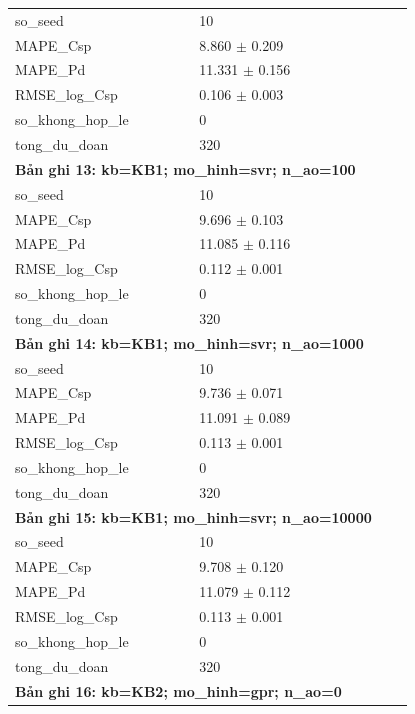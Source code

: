 \begin{longtable}{p{0.43\linewidth}p{0.50\linewidth}}
so\_\allowbreak seed & 10 \\
MAPE\_\allowbreak Csp & 8.860 $\pm$ 0.209 \\
MAPE\_\allowbreak Pd & 11.331 $\pm$ 0.156 \\
RMSE\_\allowbreak log\_\allowbreak Csp & 0.106 $\pm$ 0.003 \\
so\_\allowbreak khong\_\allowbreak hop\_\allowbreak le & 0 \\
tong\_\allowbreak du\_\allowbreak doan & 320 \\
\midrule
\multicolumn{2}{p{0.95\linewidth}}{\textbf{Bản ghi 13: kb=KB1; mo\_hinh=svr; n\_ao=100}} \\
so\_\allowbreak seed & 10 \\
MAPE\_\allowbreak Csp & 9.696 $\pm$ 0.103 \\
MAPE\_\allowbreak Pd & 11.085 $\pm$ 0.116 \\
RMSE\_\allowbreak log\_\allowbreak Csp & 0.112 $\pm$ 0.001 \\
so\_\allowbreak khong\_\allowbreak hop\_\allowbreak le & 0 \\
tong\_\allowbreak du\_\allowbreak doan & 320 \\
\midrule
\multicolumn{2}{p{0.95\linewidth}}{\textbf{Bản ghi 14: kb=KB1; mo\_hinh=svr; n\_ao=1000}} \\
so\_\allowbreak seed & 10 \\
MAPE\_\allowbreak Csp & 9.736 $\pm$ 0.071 \\
MAPE\_\allowbreak Pd & 11.091 $\pm$ 0.089 \\
RMSE\_\allowbreak log\_\allowbreak Csp & 0.113 $\pm$ 0.001 \\
so\_\allowbreak khong\_\allowbreak hop\_\allowbreak le & 0 \\
tong\_\allowbreak du\_\allowbreak doan & 320 \\
\midrule
\multicolumn{2}{p{0.95\linewidth}}{\textbf{Bản ghi 15: kb=KB1; mo\_hinh=svr; n\_ao=10000}} \\
so\_\allowbreak seed & 10 \\
MAPE\_\allowbreak Csp & 9.708 $\pm$ 0.120 \\
MAPE\_\allowbreak Pd & 11.079 $\pm$ 0.112 \\
RMSE\_\allowbreak log\_\allowbreak Csp & 0.113 $\pm$ 0.001 \\
so\_\allowbreak khong\_\allowbreak hop\_\allowbreak le & 0 \\
tong\_\allowbreak du\_\allowbreak doan & 320 \\
\midrule
\multicolumn{2}{p{0.95\linewidth}}{\textbf{Bản ghi 16: kb=KB2; mo\_hinh=gpr; n\_ao=0}} \\

\end{longtable}
